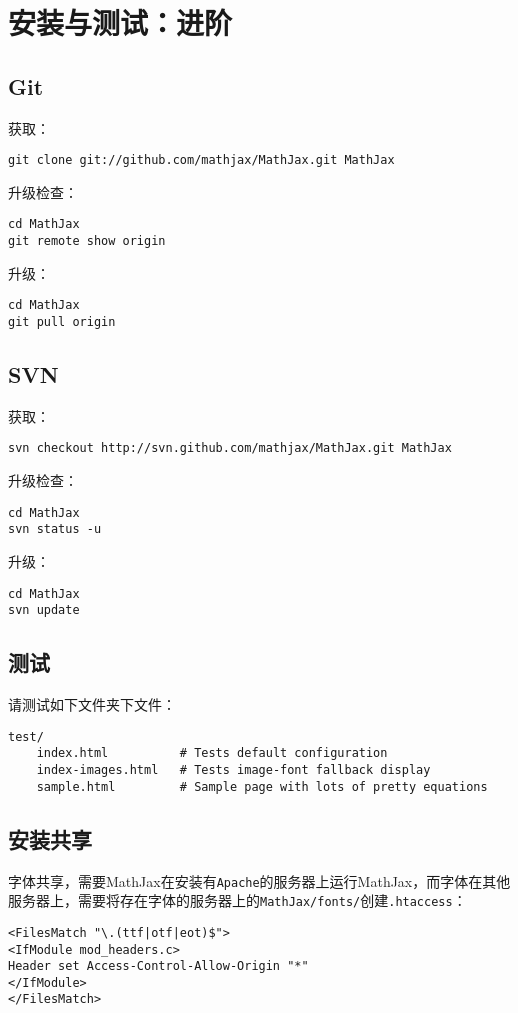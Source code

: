 \documentclass{article}
\begin{document}
\section{安装与测试：进阶}
\subsection{Git}
获取：
\begin{verbatim}
git clone git://github.com/mathjax/MathJax.git MathJax
\end{verbatim}

升级检查：
\begin{verbatim}
cd MathJax
git remote show origin
\end{verbatim}

升级：
\begin{verbatim}
cd MathJax
git pull origin
\end{verbatim}
\subsection{SVN}
获取：
\begin{verbatim}
svn checkout http://svn.github.com/mathjax/MathJax.git MathJax
\end{verbatim}

升级检查：
\begin{verbatim}
cd MathJax
svn status -u
\end{verbatim}

升级：
\begin{verbatim}
cd MathJax
svn update
\end{verbatim}
\subsection{测试}
请测试如下文件夹下文件：
\begin{verbatim}
test/
    index.html          # Tests default configuration
    index-images.html   # Tests image-font fallback display
    sample.html         # Sample page with lots of pretty equations
\end{verbatim}
\subsection{安装共享}
字体共享，需要MathJax在安装有\verb!Apache!的服务器上运行MathJax，而字体在其他服务器上，需要将存在字体的服务器上的\verb!MathJax/fonts/!创建\verb!.htaccess!：
\begin{verbatim}
<FilesMatch "\.(ttf|otf|eot)$">
<IfModule mod_headers.c>
Header set Access-Control-Allow-Origin "*"
</IfModule>
</FilesMatch>
\end{verbatim}
\end{document}
